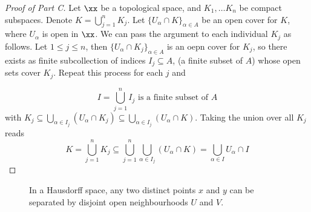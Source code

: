 \documentclass[../main-v2-manifolds.tex]{subfiles}
\begin{document}
\begin{proof}[Proof of  Part C]
    Let $\xx$ be a topological space, and $K_1,\ldots K_n$ be compact subspaces. Denote $K = \bigcup_{j=1}^n K_j$. Let $\{U_\alpha\cap K\}_{\alpha\in A}$ be an open cover for $K$, where $U_\alpha$ is open in $\xx$. We can pass the argument to each individual $K_j$ as follows. Let $1\leq j\leq n$, then $\{U_\alpha\cap K_j\}_{\alpha\in A}$ is an oepn cover for $K_j$, so there exists as finite subcollection of indices $I_j\subseteq A$, (a finite subset of $A$) whose open sets cover $K_j$. Repeat this process for each $j$ and 

    \[
        I = \bigcup_{j=1}^n I_j \text{ is a finite subset of } A
    \]
    with $K_j\subseteq \bigcup_{\alpha\in I_j}(U_\alpha\cap K_j)\subseteq \bigcup_{\alpha\in I_j}(U_\alpha\cap K)$. Taking the union over all $K_j$ reads
    \[
        K = \bigcup_{j=1}^n K_j\subseteq \bigcup_{j=1}^n \bigcup_{\alpha\in I_j}(U_\alpha\cap K)=\bigcup_{\alpha\in I}U_\alpha\cap I
    \]
\end{proof}
\begin{figure}[htbp]
        \centering
        \caption{In a Hausdorff space, any two distinct points $x$ and $y$ can be separated by disjoint open neighbourhoods $U$ and $V$.}
        \label{lee-appendix-A.45D Hausdorff}
    \end{figure}
\end{document}
